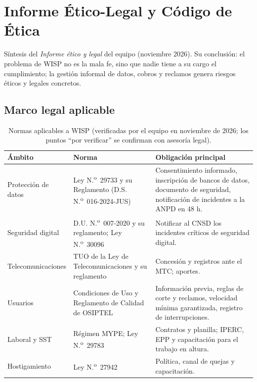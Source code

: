 \chapter{Informe Ético-Legal y Código de Ética}
\label{anx:sgsi-etica}

Síntesis del \emph{Informe ético y legal} del equipo (noviembre 2026). Su conclusión: el
problema de WISP no es la mala fe, sino que nadie tiene a su cargo el cumplimiento; la
gestión informal de datos, cobros y reclamos genera riesgos éticos y legales concretos.

\section{Marco legal aplicable}

\begin{table}[H]
\centering
\caption{Normas aplicables a WISP (verificadas por el equipo en noviembre de 2026; los puntos ``por verificar'' se confirman con asesoría legal).}
\label{tab:anx-etica-marco}
\small
\begin{tabularx}{\textwidth}{L{2.6cm}L{4.2cm}X}
\toprule
\textbf{Ámbito} & \textbf{Norma} & \textbf{Obligación principal} \\
\midrule
Protección de datos & Ley N.\textsuperscript{o}~29733 y su Reglamento (D.S. N.\textsuperscript{o}~016-2024-JUS) & Consentimiento informado, inscripción de bancos de datos, documento de seguridad, notificación de incidentes a la ANPD en 48 h. \\
Seguridad digital & D.U. N.\textsuperscript{o}~007-2020 y su reglamento; Ley N.\textsuperscript{o}~30096 & Notificar al CNSD los incidentes críticos de seguridad digital. \\
Telecomunicaciones & TUO de la Ley de Telecomunicaciones y su reglamento & Concesión y registros ante el MTC; aportes. \\
Usuarios & Condiciones de Uso y Reglamento de Calidad de OSIPTEL & Información previa, reglas de corte y reclamos, velocidad mínima garantizada, registro de interrupciones. \\
Laboral y SST & Régimen MYPE; Ley N.\textsuperscript{o}~29783 & Contratos y planilla; IPERC, EPP y capacitación para el trabajo en altura. \\
Hostigamiento & Ley N.\textsuperscript{o}~27942 & Política, canal de quejas y capacitación. \\
\bottomrule
\end{tabularx}
\end{table}

